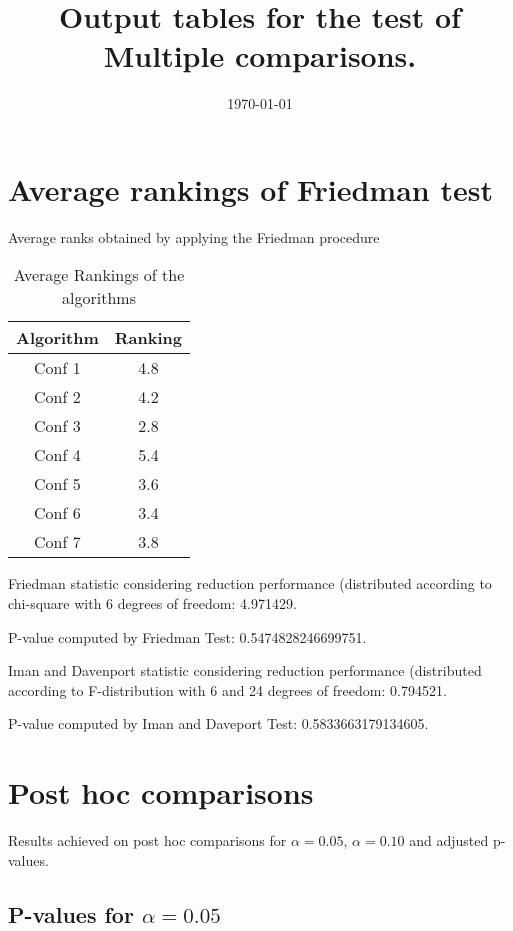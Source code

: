 \documentclass[a4paper,10pt]{article}
\title{Output tables for the test of Multiple comparisons.}
\author{}
\date{\today}
\begin{document}
\begin{landscape}
\pagestyle{empty}
\maketitle
\thispagestyle{empty}
\section{Average rankings of Friedman test}



Average ranks obtained by applying the Friedman procedure

\begin{table}[!htp]
\centering
\begin{tabular}{|c|c|}\hline
Algorithm&Ranking\\\hline
Conf 1 & 4.8\\
Conf 2 & 4.2\\
Conf 3 & 2.8\\
Conf 4 & 5.4\\
Conf 5 & 3.6\\
Conf 6 & 3.4\\
Conf 7 & 3.8\\
\hline
\end{tabular}
\caption{Average Rankings of the algorithms}
\end{table}

Friedman statistic considering reduction performance (distributed according to chi-square with 6 degrees of freedom: 4.971429.

P-value computed by Friedman Test: 0.5474828246699751.\newline

Iman and Davenport statistic considering reduction performance (distributed according to F-distribution with 6 and 24 degrees of freedom: 0.794521.

P-value computed by Iman and Daveport Test: 0.5833663179134605.\newline



\pagebreak

\section{Post hoc comparisons}

Results achieved on post hoc comparisons for $\alpha = 0.05$, $\alpha = 0.10$ and adjusted p-values.

\subsection{P-values for $\alpha=0.05$}


\end{landscape}
\end{document}
